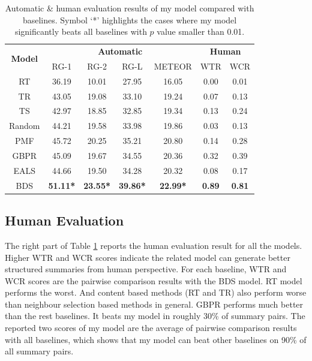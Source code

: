 \begin{table}
	
	\centering
	
	\begin{tabular}{ccccccc} 
		\toprule
		\multirow{2}{*}{ \textbf{Model}}&  \multicolumn{4}{c}{\textbf{Automatic}} & \multicolumn{2}{c}{\textbf{Human }}\\ \cmidrule(lr){2-7}
		&RG-1&RG-2&RG-L&METEOR &WTR &WCR \\ \midrule 
		RT &  36.19 & 10.01 & 27.95 & 16.05& 0.00&0.01\\ 
		TR& 43.05  & 19.08 &  33.10  & 19.24 & 0.07&0.13 \\ 
		TS & 42.97  & 18.85  & 32.85  & 19.34 &0.13 &0.24 \\ 
		Random& 44.21 &  19.58 &  33.98  &  19.86 &0.03 &0.13\\ 
		PMF & 45.72 &  20.25  &  35.21  & 20.80 &0.14 & 0.28\\ 
		GBPR& 45.09 &  19.67  &  34.55&  20.36 & 0.32&0.39\\ 
		EALS& 44.66  & 19.50  &  34.28 &    20.32&0.08 &0.17\\ 
		BDS& \textbf{51.11*} & \textbf{23.55*}& \textbf{39.86*} &  \textbf{22.99* }&  \textbf{0.89 }& \textbf{0.81 }\\ \bottomrule
	\end{tabular}
	\caption{Automatic \& human evaluation results of my model compared with baselines. Symbol ‘*’ highlights the cases where my model significantly beats all baselines with $p$ value smaller than 0.01.}
	\label{tab:auto-eval}
\end{table} 
 
\subsection{Human Evaluation}
The right part of Table \ref{tab:auto-eval} reports the human evaluation result for all the models. Higher WTR and WCR scores indicate the related model can generate better structured summaries from human perspective. For each baseline, WTR and WCR scores are the pairwise comparison results with the BDS model. RT model performs the worst.  And content based methods (RT and TR) also perform worse than neighbour selection based methods in general. GBPR performs much better than the rest baselines. It beats my model in roughly 30\% of summary pairs.  The reported two scores of my model are the average of pairwise comparison results with all baselines, which shows that my model can beat other baselines on 90\% of all summary pairs.

